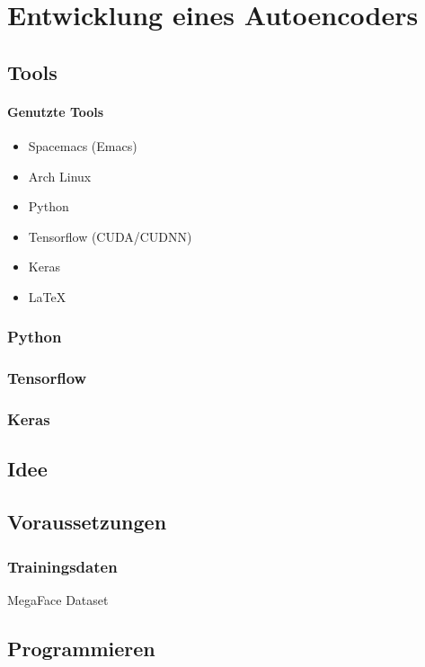 \documentclass[../main]{subfiles}
\begin{document}
\section{Entwicklung eines Autoencoders}
\subsection{Tools}
\paragraph{Genutzte Tools}
\begin{itemize}
  \item{Spacemacs (Emacs)}
  \item{Arch Linux}
  \item{Python}
  \item{Tensorflow (CUDA/CUDNN)}
  \item{Keras}
  \item{\LaTeX{}}


\end{itemize}

\subsubsection{Python}
\subsubsection{Tensorflow}
\subsubsection{Keras}
\subsection{Idee}
\subsection{Voraussetzungen}
\subsubsection{Trainingsdaten}
MegaFace Dataset
\subsection{Programmieren}
\end{document}
